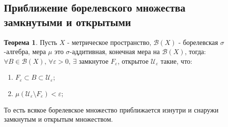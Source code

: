 \documentclass[12pt]{article}
\newcommand{\MU}{\mathcal{U}}
\newcommand{\MB}{\mathcal{B}}
\newcommand{\VE}{\varepsilon}
\theoremstyle{definition}
\newtheorem{theorem}{Теорема}
\begin{document}
\subsection*{Приближение борелевского множества замкнутыми и открытыми}
\begin{theorem}
	Пусть $X$ - метрическое пространство, $\MB(X)$ - борелевская $\sigma$-алгебра, мера $\mu$ это $\sigma$-аддитивная, конечная мера на $\MB(X)$, тогда: $\forall B \in \MB(X), \, \forall \VE > 0, \, \exists$ замкнутое $F_\VE$, открытое $\MU_\VE$ такие, что:
	\begin{enumerate}[label=\arabic*)]
		\item $F_\VE \subset B \subset \MU_\VE$;
		\item $\mu(\MU_\VE\setminus F_\VE) < \VE$;
	\end{enumerate}
	То есть всякое борелевское множество приближается изнутри и снаружи замкнутым и открытым множеством.
\end{theorem}
\end{document}
